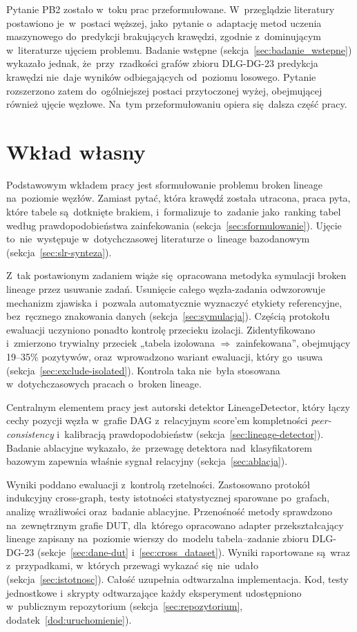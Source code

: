 \documentclass[polish,master,a4paper,oneside]{ppfcmthesis}
\renewcommand{\_}{\origtextunderscore\ifmmode\else\allowbreak\fi}
\begin{document}
Pytanie PB2 zostało w~toku prac przeformułowane. W~przeglądzie
literatury postawiono je~w~postaci węższej, jako~pytanie o~adaptację metod
uczenia maszynowego do~predykcji brakujących krawędzi, zgodnie
z~dominującym w~literaturze ujęciem problemu. Badanie wstępne
(sekcja~\ref{sec:badanie_wstepne}) wykazało jednak, że~przy~rzadkości grafów
zbioru DLG-DG-23 predykcja krawędzi nie~daje wyników odbiegających
od~poziomu losowego. Pytanie rozszerzono zatem do~ogólniejszej postaci
przytoczonej wyżej, obejmującej również ujęcie węzłowe. Na~tym
przeformułowaniu opiera się~dalsza część pracy.

\section{Wkład własny}
\label{sec:wklad}

Podstawowym wkładem pracy jest sformułowanie problemu broken lineage
na~poziomie węzłów. Zamiast pytać, która krawędź została utracona, praca
pyta, które tabele są~dotknięte brakiem, i~formalizuje to~zadanie
jako~ranking tabel według prawdopodobieństwa zainfekowania
(sekcja~\ref{sec:sformulowanie}). Ujęcie to~nie~występuje
w~dotychczasowej literaturze o~lineage bazodanowym
(sekcja~\ref{sec:slr-synteza}).

Z~tak postawionym zadaniem wiąże się~opracowana metodyka symulacji broken
lineage przez usuwanie zadań. Usunięcie całego węzła-zadania odwzorowuje
mechanizm zjawiska i~pozwala automatycznie wyznaczyć etykiety referencyjne,
bez~ręcznego znakowania danych (sekcja~\ref{sec:symulacja}). Częścią
protokołu ewaluacji uczyniono ponadto kontrolę przecieku izolacji.
Zidentyfikowano i~zmierzono trywialny przeciek
„tabela izolowana $\Rightarrow$ zainfekowana'', obejmujący 19--35\%
pozytywów, oraz~wprowadzono wariant ewaluacji, który go~usuwa
(sekcja~\ref{sec:exclude-isolated}). Kontrola taka nie~była stosowana
w~dotychczasowych pracach o~broken lineage.

Centralnym elementem pracy jest autorski detektor LineageDetector, który łączy
cechy pozycji węzła w~grafie DAG z~relacyjnym score'em kompletności
\emph{peer-consistency} i~kalibracją prawdopodobieństw
(sekcja~\ref{sec:lineage-detector}). Badanie ablacyjne wykazało,
że~przewagę detektora nad~klasyfikatorem bazowym zapewnia właśnie sygnał
relacyjny (sekcja~\ref{sec:ablacja}).

Wyniki poddano ewaluacji z~kontrolą rzetelności. Zastosowano protokół
indukcyjny cross-graph, testy istotności statystycznej sparowane po~grafach,
analizę wrażliwości oraz~badanie ablacyjne. Przenośność metody sprawdzono
na~zewnętrznym grafie DUT, dla~którego opracowano adapter przekształcający
lineage zapisany na~poziomie wierszy do~modelu tabela–zadanie zbioru
DLG-DG-23 (sekcje~\ref{sec:dane-dut} i~\ref{sec:cross_dataset}). Wyniki
raportowane są~wraz z~przypadkami, w~których przewagi wykazać się~nie~udało
(sekcja~\ref{sec:istotnosc}). Całość uzupełnia odtwarzalna implementacja.
Kod, testy jednostkowe i~skrypty odtwarzające każdy eksperyment udostępniono
w~publicznym repozytorium (sekcja~\ref{sec:repozytorium},
dodatek~\ref{dod:uruchomienie}).
\end{document}
